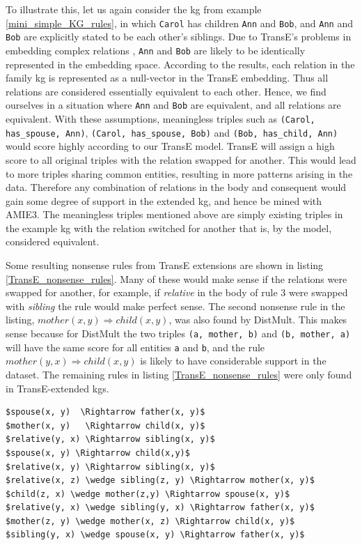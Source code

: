 To illustrate this, let us again consider the \gls{kg} from example \ref{mini_simple_KG_rules}, in which \texttt{Carol} has children \texttt{Ann} and \texttt{Bob}, and \texttt{Ann} and \texttt{Bob} are explicitly stated to be each other's siblings. Due to TransE's problems in embedding complex relations \cite{transH, transR}, \texttt{Ann} and \texttt{Bob} are likely to be identically represented in the embedding space. According to the results, each relation in the family \gls{kg} is represented as a null-vector in the TransE embedding. Thus all relations are considered essentially equivalent to each other. Hence, we find ourselves in a situation where \texttt{Ann} and \texttt{Bob} are equivalent, and all relations are equivalent. With these assumptions, meaningless triples such as
\texttt{(Carol, has\_spouse, Ann)}, \texttt{(Carol, has\_spouse, Bob)} and \texttt{(Bob, has\_child, Ann)} would score highly according to our TransE model. TransE will assign a high score to all original triples with the relation swapped for another. This would lead to more triples sharing common entities, resulting in more patterns arising in the data. Therefore any combination of relations in the body and consequent would gain some degree of support in the extended \gls{kg}, and hence be mined with AMIE3. The meaningless triples mentioned above are simply existing triples in the example \gls{kg} with the relation switched for another that is, by the model, considered equivalent. 

Some resulting nonsense rules from TransE extensions are shown in listing \ref{TransE_nonsense_rules}. Many of these would make sense if the relations were swapped for another, for example, if \textit{relative} in the body of rule 3 were swapped with \textit{sibling} the rule would make perfect sense. The second nonsense rule in the listing, $mother(x, y) \Rightarrow child(x, y)$, was also found by DistMult. This makes sense because for DistMult the two triples \texttt{(a, mother, b)} and \texttt{(b, mother, a)} will have the same score for all entities \texttt{a} and \texttt{b}, and the rule $mother(y, x) \Rightarrow child(x, y)$ is likely to have considerable support in the dataset. The remaining rules in listing \ref{TransE_nonsense_rules} were only found in TransE-extended \glspl{kg}.

\begin{lstlisting}[mathescape=true, float, caption={Selection of nonsense rules mined from KGs extended with TransE.},captionpos=b, label={TransE_nonsense_rules}]
$spouse(x, y)  \Rightarrow father(x, y)$
$mother(x, y)   \Rightarrow child(x, y)$
$relative(y, x) \Rightarrow sibling(x, y)$
$spouse(x, y) \Rightarrow child(x,y)$
$relative(x, y) \Rightarrow sibling(x, y)$
$relative(x, z) \wedge sibling(z, y) \Rightarrow mother(x, y)$
$child(z, x) \wedge mother(z,y) \Rightarrow spouse(x, y)$
$relative(y, x) \wedge sibling(y, x) \Rightarrow father(x, y)$
$mother(z, y) \wedge mother(x, z) \Rightarrow child(x, y)$
$sibling(y, x) \wedge spouse(x, y) \Rightarrow father(x, y)$
\end{lstlisting}

